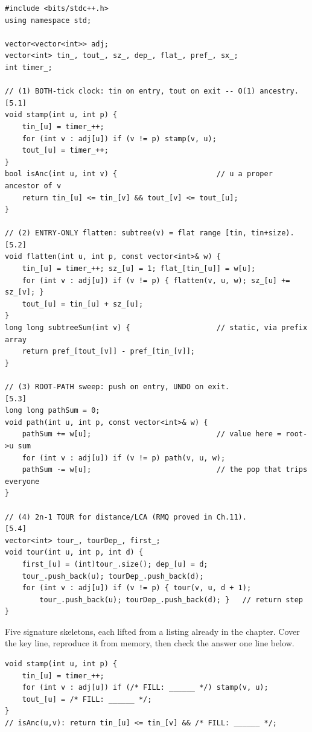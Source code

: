 \begin{lstlisting}[caption={Chapter 5 code kit: stamp, flatten, path, tour}, label={lst:c24-kit}]
#include <bits/stdc++.h>
using namespace std;

vector<vector<int>> adj;
vector<int> tin_, tout_, sz_, dep_, flat_, pref_, sx_;
int timer_;

// (1) BOTH-tick clock: tin on entry, tout on exit -- O(1) ancestry. [5.1]
void stamp(int u, int p) {
    tin_[u] = timer_++;
    for (int v : adj[u]) if (v != p) stamp(v, u);
    tout_[u] = timer_++;
}
bool isAnc(int u, int v) {                       // u a proper ancestor of v
    return tin_[u] <= tin_[v] && tout_[v] <= tout_[u];
}

// (2) ENTRY-ONLY flatten: subtree(v) = flat range [tin, tin+size). [5.2]
void flatten(int u, int p, const vector<int>& w) {
    tin_[u] = timer_++; sz_[u] = 1; flat_[tin_[u]] = w[u];
    for (int v : adj[u]) if (v != p) { flatten(v, u, w); sz_[u] += sz_[v]; }
    tout_[u] = tin_[u] + sz_[u];
}
long long subtreeSum(int v) {                    // static, via prefix array
    return pref_[tout_[v]] - pref_[tin_[v]];
}

// (3) ROOT-PATH sweep: push on entry, UNDO on exit.                 [5.3]
long long pathSum = 0;
void path(int u, int p, const vector<int>& w) {
    pathSum += w[u];                             // value here = root->u sum
    for (int v : adj[u]) if (v != p) path(v, u, w);
    pathSum -= w[u];                             // the pop that trips everyone
}

// (4) 2n-1 TOUR for distance/LCA (RMQ proved in Ch.11).             [5.4]
vector<int> tour_, tourDep_, first_;
void tour(int u, int p, int d) {
    first_[u] = (int)tour_.size(); dep_[u] = d;
    tour_.push_back(u); tourDep_.push_back(d);
    for (int v : adj[u]) if (v != p) { tour(v, u, d + 1);
        tour_.push_back(u); tourDep_.push_back(d); }   // return step
}
\end{lstlisting}


Five signature skeletons, each lifted from a listing already in the chapter. Cover the key
line, reproduce it from memory, then check the answer one line below.

\begin{lstlisting}[caption={Drill 1 -- stamp entry/exit and test ancestry (from \coderef{c24-stamp})}]
void stamp(int u, int p) {
    tin_[u] = timer_++;
    for (int v : adj[u]) if (/* FILL: ______ */) stamp(v, u);
    tout_[u] = /* FILL: ______ */;
}
// isAnc(u,v): return tin_[u] <= tin_[v] && /* FILL: ______ */;
\end{lstlisting}

